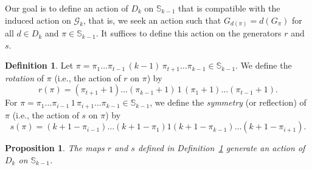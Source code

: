 \documentclass{birkjour}
\newtheorem{prop}[thm]{Proposition}
\theoremstyle{definition}
\newtheorem{defn}[thm]{Definition}
\theoremstyle{remark}
\numberwithin{equation}{section}
\begin{document}
Our goal is to define an action of $D_k$ on $\mathbb S_{k-1}$ that
is compatible with the induced action on $\mathcal{G}_k$, that is,
we seek an action such that $G_{d(\pi)}=d(G_{\pi})$ for all $d\in
D_k$ and $\pi\in\mathbb S_{k-1}$. It suffices to define this
action on the generators $r$ and $s$.

\begin{defn}\label{D:actiononS} Let $\pi=\pi_1\ldots\pi_{t-1}\,
(k-1)\, \pi_{t+1}\ldots\pi_{k-1}\in\mathbb S_{k-1}$. We define the
\emph{rotation} of $\pi$ (i.e., the action of $r$ on $\pi$) by
\[r(\pi)=(\pi_{t+1}+1)
\ldots(\pi_{k-1}+1)\,1\,(\pi_1+1)\ldots(\pi_{t-1}+1).\] For
$\pi=\pi_1\ldots\pi_{i-1}\, 1\,\pi_{i+1}\ldots\pi_{k-1}\in\mathbb
S_{k-1}$, we define the \emph{symmetry} (or reflection) of $\pi$
(i.e., the action of $s$ on $\pi$) by
\[s(\pi)=(k+1-\pi_{i-1})\ldots(k+1-\pi_{1})1(k+1-\pi_{k-1})
\ldots(k+1-\pi_{i+1}).\]
\end{defn}
\begin{prop}\label{P:DejstvoD-knaS} The maps $r$ and $s$
defined in Definition~\ref{D:actiononS}
 generate an action of $D_k$ on $\mathbb S_{k-1}$.
\end{prop}
\end{document}

